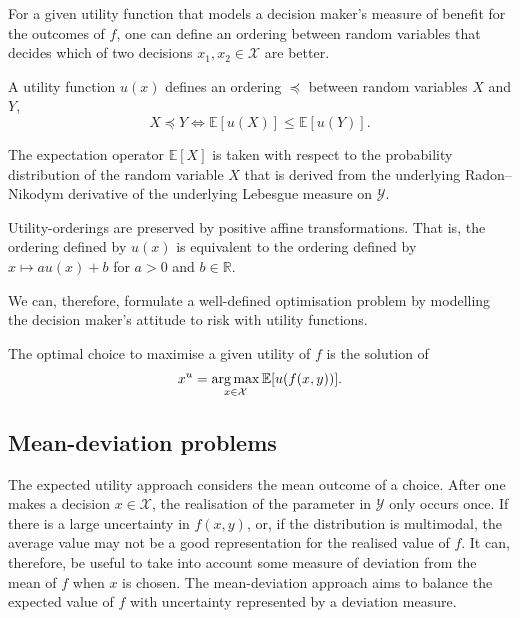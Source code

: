\documentclass[main.tex]{subfiles}
\begin{document}
For a given utility function that models a decision maker's measure of
benefit for the outcomes of $f$, one can define an ordering
between random variables that decides which of two decisions
$x_1,x_2\in\mathcal{X}$ are better.
\begin{mydef}
  A utility function $u(x)$ defines an ordering $\preceq$ between random
  variables $X$ and $Y$,
  \begin{equation}
    X\preceq Y \Leftrightarrow \mathbb{E}[u(X)] \leq \mathbb{E}[u(Y)].
  \end{equation}
\end{mydef}
The expectation operator $\mathbb{E}[X]$ is taken with respect to the
probability distribution of the random variable $X$ that is derived
from the underlying Radon--Nikodym derivative of the underlying
Lebesgue measure on $\mathcal{Y}$.

\begin{remark}
  Utility-orderings are preserved by positive affine transformations.
  That is, the ordering defined by $u(x)$ is equivalent to the
  ordering defined by $x\mapsto au(x)+b$ for  $a>0$ and $b\in\mathbb{R}$.
\end{remark}


We can, therefore, formulate a well-defined optimisation problem by
modelling the decision maker's attitude to risk with utility functions.

\begin{problem}
  The optimal choice to maximise a given utility of $f$ is the
  solution of
  \begin{align}
    x^u=\operatorname*{arg\,max}_{x\in\mathcal{X}} \mathbb{E}[u(f(x,y))].
  \end{align}
\end{problem}

\subsection{Mean-deviation problems}
The expected utility approach considers the mean outcome of a choice.
After one makes a decision $x\in\mathcal{X}$, the realisation of the
parameter in $\mathcal{Y}$ only occurs once. If there is a large
uncertainty in $f(x,y)$, or, if the distribution is multimodal, the
average value may not be a good representation for the realised value of $f$.
It can, therefore, be useful to take into account some measure of
deviation from the mean of $f$ when $x$ is chosen.
The mean-deviation approach aims to balance the expected value of $f$
with uncertainty represented by a deviation measure.
\end{document}
